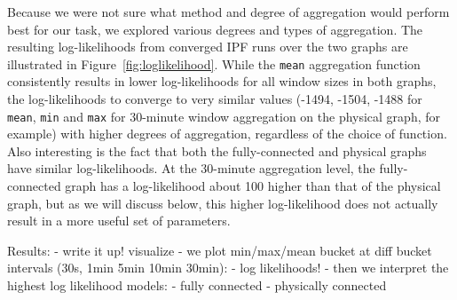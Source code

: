 Because we were not sure what method and degree of aggregation would perform best for our task, we explored various degrees and types of aggregation.
The resulting log-likelihoods from converged IPF runs over the two graphs are illustrated in Figure~\ref{fig:loglikelihood}.
While the \texttt{mean} aggregation function consistently results in lower log-likelihoods for all window sizes in both graphs, the log-likelihoods to converge to very similar values (-1494, -1504, -1488 for \texttt{mean}, \texttt{min} and \texttt{max} for 30-minute window aggregation on the physical graph, for example) with higher degrees of aggregation, regardless of the choice of function.
Also interesting is the fact that both the fully-connected and physical graphs have similar log-likelihoods.
At the 30-minute aggregation level, the fully-connected graph has a log-likelihood about 100 higher than that of the physical graph, but as we will discuss below, this higher log-likelihood does not actually result in a more useful set of parameters.


Results:
- write it up! visualize
- we plot min/max/mean bucket at diff bucket intervals (30s, 1min 5min 10min 30min):
    - log likelihoods!
- then we interpret the highest log likelihood models:
    - fully connected
    - physically connected
\fi
